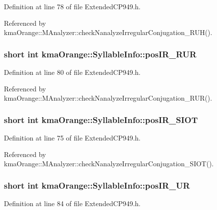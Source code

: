 Definition at line 78 of file ExtendedCP949.h.

Referenced by kmaOrange::MAnalyzer::checkNanalyzeIrregularConjugation\_\-RUH().\hypertarget{structkmaOrange_1_1SyllableInfo_41f28a49807a3a05ebd1a84a31562cac}{
\subsubsection[{posIR\_\-RUR}]{\setlength{\rightskip}{0pt plus 5cm}short int {\bf kmaOrange::SyllableInfo::posIR\_\-RUR}}}
\label{structkmaOrange_1_1SyllableInfo_41f28a49807a3a05ebd1a84a31562cac}




Definition at line 80 of file ExtendedCP949.h.

Referenced by kmaOrange::MAnalyzer::checkNanalyzeIrregularConjugation\_\-RUR().\hypertarget{structkmaOrange_1_1SyllableInfo_d18d17adb38c372d995a7cb34d100472}{
\subsubsection[{posIR\_\-SIOT}]{\setlength{\rightskip}{0pt plus 5cm}short int {\bf kmaOrange::SyllableInfo::posIR\_\-SIOT}}}
\label{structkmaOrange_1_1SyllableInfo_d18d17adb38c372d995a7cb34d100472}




Definition at line 75 of file ExtendedCP949.h.

Referenced by kmaOrange::MAnalyzer::checkNanalyzeIrregularConjugation\_\-SIOT().\hypertarget{structkmaOrange_1_1SyllableInfo_a836d4f2a9b49b68a51140955fa2003c}{
\subsubsection[{posIR\_\-UR}]{\setlength{\rightskip}{0pt plus 5cm}short int {\bf kmaOrange::SyllableInfo::posIR\_\-UR}}}
\label{structkmaOrange_1_1SyllableInfo_a836d4f2a9b49b68a51140955fa2003c}




Definition at line 84 of file ExtendedCP949.h.

